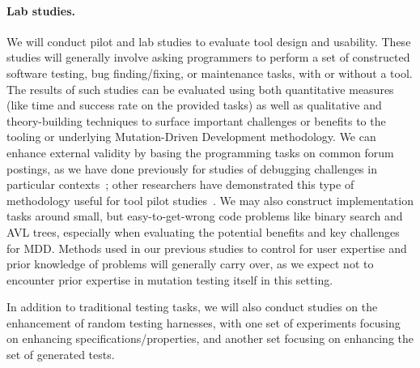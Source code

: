 \paragraph{Lab studies.}
We will conduct pilot and lab studies to evaluate tool design
and usability.
These studies will generally involve asking programmers to perform a set of
constructed software testing, bug finding/fixing, or maintenance tasks, with or
without a tool.  The results of such studies can be evaluated using both
quantitative measures (like time and success rate on the provided tasks) as well
as qualitative and theory-building techniques to surface
important challenges or benefits to the tooling or underlying Mutation-Driven
Development methodology.  We can enhance external validity by basing the
programming tasks on common forum postings, as we have done previously for
studies of debugging challenges in particular
contexts~\cite{frameworkDebugging}; other researchers have demonstrated this
type of methodology useful for tool pilot studies~\cite{sunshineDocumentation}.
We may also construct implementation tasks around small, but easy-to-get-wrong
code problems like binary search and AVL trees, especially when evaluating the
potential benefits and key challenges for MDD.  Methods used in our
previous studies to control for user expertise and prior knowledge of
problems will generally carry over, as we expect not to encounter
prior expertise in mutation testing itself in this setting.

In addition to traditional testing tasks, we will also conduct studies
on the enhancement of random testing harnesses, with one set of
experiments focusing on enhancing specifications/properties, and
another set focusing on enhancing the set of generated tests.

